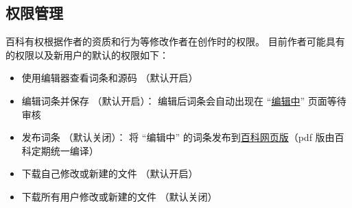 \subsection{权限管理}
百科有权根据作者的资质和行为等修改作者在创作时的权限。 目前作者可能具有的权限以及新用户的默认的权限如下：
\begin{itemize}
\item 使用编辑器查看词条和源码 （默认开启）
\item 编辑词条并保存 （默认开启）： 编辑后词条会自动出现在 “\href{https://wuli.wiki/changed}{编辑中}” 页面等待审核
\item 发布词条 （默认关闭）： 将 “编辑中” 的词条发布到\href{https://wuli.wiki/online}{百科网页版}（pdf 版由百科定期统一编译）
\item 下载自己修改或新建的文件 （默认开启）
\item 下载所有用户修改或新建的文件 （默认关闭）
\end{itemize}
